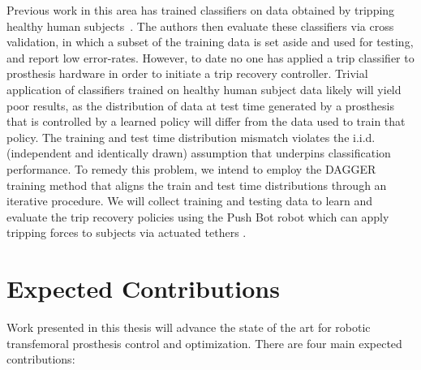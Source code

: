 Previous work in this area has trained classifiers on data obtained by tripping
healthy human subjects~\citep{lawson2010stumble, shirota2014recovery}. The
authors then evaluate these classifiers via cross validation, in which a subset
of the training data is set aside and used for testing, and report low
error-rates.  However, to date no one has applied a trip classifier to
prosthesis hardware in order to initiate a trip recovery controller. Trivial
application of classifiers trained on healthy human subject data likely will
yield poor results, as the distribution of data at test time generated by a
prosthesis that is controlled by a learned policy will differ from the data used
to train that policy. The training and test time distribution mismatch violates
the i.i.d. (independent and identically drawn) assumption that
underpins classification performance. To remedy this problem, we intend to
employ the DAGGER training method \citep{ross2011reduction} that aligns the
train and test time distributions through an iterative procedure. We will
collect training and testing data to learn and evaluate the trip recovery
policies using the Push Bot robot which can apply tripping forces to subjects
via actuated tethers \citep{emanuel2016disturbance}.

\section{Expected Contributions}\label{sec:intro_contributions}

Work presented in this thesis will advance the state of the art for robotic
transfemoral prosthesis control and optimization. There are four main expected 
contributions: 

